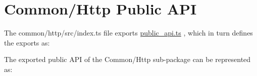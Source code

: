 \section{Common/Http Public API}

The common/http/src/index.ts file exports
\url{public_api.ts}
, which in turn defines the
exports as:



The exported public API of the Common/Http sub-package can be represented as:
